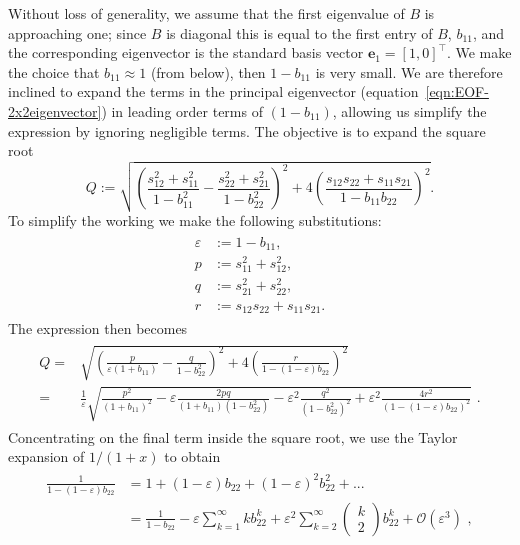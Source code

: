 Without loss of generality, we assume that the first eigenvalue of $B$ is approaching one; since $B$ is diagonal this is equal to the first entry of $B$, $b_{11}$, and the corresponding eigenvector is the standard basis vector $\mathbf{e}_1 = [1,0]^\top$.
We make the choice that $b_{11}\approx 1$ (from below), then 
$1-b_{11}$ is very small. We are therefore inclined to expand the terms in the principal eigenvector (equation~\ref{eqn:EOF-2x2eigenvector}) in leading order terms of $(1-b_{11})$, allowing us simplify the expression by ignoring negligible terms. The objective is to expand the square root
\begin{equation}
	Q := \sqrt{\left(\frac{s_{12}^2+s_{11}^2}{1-b_{11}^2}-\frac{s_{22}^2+s_{21}^2}{1-b_{22}^2}\right)^2+4\left(\frac{s_{12}s_{22}+s_{11}s_{21}}{1-b_{11}b_{22}}\right)^2}.
\end{equation}
To simplify the working we make the following substitutions:
	\begin{align}
	\begin{split}
		\varepsilon &:=1-b_{11},\\
		p &:= s_{11}^2+s_{12}^2,\\
		q &:= s_{21}^2+s_{22}^2, \\
		r &:= s_{12}s_{22}+s_{11}s_{21}.
	\end{split}
	\end{align}
The expression then becomes
	\begin{align}
	\begin{split}
		Q =& \sqrt{\left(\frac{p}{\varepsilon(1+b_{11})}-\frac{q}{1-b_{22}^2}\right)^2+4\left(\frac{r}{1-(1-\varepsilon) b_{22}}\right)^2}\\
		=& \frac{1}{\varepsilon}\sqrt{\frac{p^2}{(1+b_{11})^2}-\varepsilon\frac{2pq}{(1+b_{11})(1-b_{22}^2)}-\varepsilon^2\frac{q^2}{(1-b_{22}^2)^2}+\varepsilon^2\frac{4r^2}{(1-(1-\varepsilon) b_{22})^2}} \,\, .
	\end{split}
	\end{align}
Concentrating on the final term inside the square root, we use the Taylor expansion of $1/(1+x)$ to obtain
	\begin{align}
	\begin{split}
		\frac{1}{1-(1-\varepsilon) b_{22}} &= 1+(1-\varepsilon) b_{22}+(1-\varepsilon)^2 b_{22}^2+...\\
		&=\frac{1}{1-b_{22}} -
		\varepsilon\sum_{k=1}^\infty kb_{22}^k + \varepsilon^2\sum_{k=2}^\infty\left(\begin{array}{c}	k\\2\end{array}\right)b_{22}^k + \mathcal{O}(\varepsilon^3) \,\, ,
	\end{split}
	\end{align}
